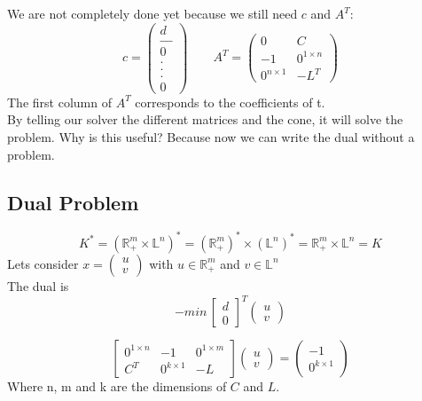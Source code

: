 \documentclass[11pt,a4paper]{article}
\begin{document}
We are not completely done yet because we still need $c$ and $A^T$:\\
$$c = \begin{pmatrix}
d\\
\_ \_ \_ \\
0\\
. \\
. \\
. \\
0
\end{pmatrix} \qquad A^T= \begin{pmatrix}
0 & C\\
-1 & 0^{1\times n}\\
0^{n\times 1} & -L^T
\end{pmatrix}
$$
The first column of $A^T$ corresponds to the coefficients of t. \\

By telling our solver the different matrices and the cone, it will solve the problem. Why is this useful? Because now we can write the dual without a problem.

\subsection{Dual Problem}
$$K^*= (\mathbb{R}^m_+ \times \mathbb{L}^n)^*= (\mathbb{R}^m_+)^* \times (\mathbb{L}^n)^*= \mathbb{R}^m_+ \times \mathbb{L}^n = K$$
Lets consider $x= \begin{pmatrix}
u \\
v
\end{pmatrix} $ with $u \in \mathbb{R}^m_+$ and $v \in \mathbb{L}^n$\\
The dual is 
$$-min \, \begin{bmatrix}
d \\
0
\end{bmatrix}^T \begin{pmatrix}
u\\
v
\end{pmatrix} $$

\begin{equation}
\begin{bmatrix}
0^{1\times n} & -1 & 0^{1\times m}\\
C^T & 0^{k\times 1} & -L
\end{bmatrix}\begin{pmatrix}
u\\
v
\end{pmatrix}=
\begin{pmatrix}
-1\\
0^{k\times 1}
\end{pmatrix}
\end{equation}
Where n, m and k are the dimensions of $C$ and $L$.
 
\end{document}
